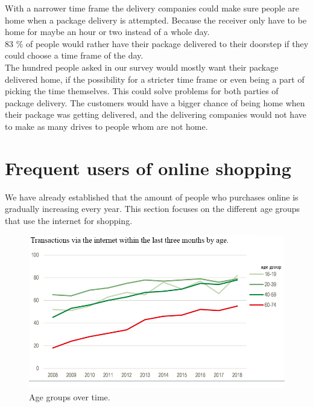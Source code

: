 \documentclass[12pt]{report}
\begin{document}
 With a narrower time frame the delivery companies could make sure people are home when a package delivery is attempted. Because the receiver only have to be home for maybe an hour or two instead of a whole day.\\\hspace*{5 mm}
 83 \% of people would rather have their package delivered to their doorstep if they could choose a time frame of the day. \\

The hundred people asked in our survey would mostly want their package delivered home, if the possibility for a stricter time frame or even being a part of picking the time themselves. This could solve problems for both parties of package delivery. The customers would have a bigger chance of being home when their package was getting delivered, and the delivering companies would not have to make as many drives to people whom are not home. 



\section{Frequent users of online shopping}
We have already established that the amount of people who purchases online is gradually increasing every year. This section focuses on the different age groups that use the internet for shopping.

\begin{figure}[H]
  \includegraphics[width=\linewidth]{pics/customer.png}
  \caption{Age groups over time. \cite{danmarkstat2}}
  \label{fig:Age groups over time}
\end{figure}
\end{document}
